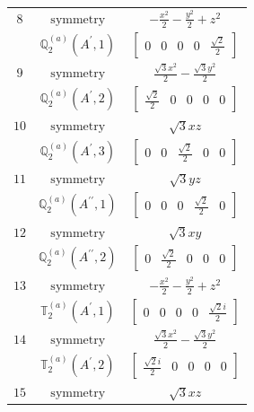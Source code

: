 \documentclass[fleqn,8pt,landscape]{jsarticle}
\begin{document}
\begin{longtable}{ccc}
$ 8 $ & $ \text{symmetry} $ & $ - \frac{x^{2}}{2} - \frac{y^{2}}{2} + z^{2} $ \\
$  $ & $ \mathbb{Q}_{2}^{(a)}(A^{\prime},1) $ & $ \begin{bmatrix} 0 & 0 & 0 & 0 & \frac{\sqrt{2}}{2} \end{bmatrix} $ \\ \hline
$ 9 $ & $ \text{symmetry} $ & $ \frac{\sqrt{3} x^{2}}{2} - \frac{\sqrt{3} y^{2}}{2} $ \\
$  $ & $ \mathbb{Q}_{2}^{(a)}(A^{\prime},2) $ & $ \begin{bmatrix} \frac{\sqrt{2}}{2} & 0 & 0 & 0 & 0 \end{bmatrix} $ \\ \hline
$ 10 $ & $ \text{symmetry} $ & $ \sqrt{3} x z $ \\
$  $ & $ \mathbb{Q}_{2}^{(a)}(A^{\prime},3) $ & $ \begin{bmatrix} 0 & 0 & \frac{\sqrt{2}}{2} & 0 & 0 \end{bmatrix} $ \\ \hline
$ 11 $ & $ \text{symmetry} $ & $ \sqrt{3} y z $ \\
$  $ & $ \mathbb{Q}_{2}^{(a)}(A^{\prime\prime},1) $ & $ \begin{bmatrix} 0 & 0 & 0 & \frac{\sqrt{2}}{2} & 0 \end{bmatrix} $ \\ \hline
$ 12 $ & $ \text{symmetry} $ & $ \sqrt{3} x y $ \\
$  $ & $ \mathbb{Q}_{2}^{(a)}(A^{\prime\prime},2) $ & $ \begin{bmatrix} 0 & \frac{\sqrt{2}}{2} & 0 & 0 & 0 \end{bmatrix} $ \\ \hline
$ 13 $ & $ \text{symmetry} $ & $ - \frac{x^{2}}{2} - \frac{y^{2}}{2} + z^{2} $ \\
$  $ & $ \mathbb{T}_{2}^{(a)}(A^{\prime},1) $ & $ \begin{bmatrix} 0 & 0 & 0 & 0 & \frac{\sqrt{2} i}{2} \end{bmatrix} $ \\ \hline
$ 14 $ & $ \text{symmetry} $ & $ \frac{\sqrt{3} x^{2}}{2} - \frac{\sqrt{3} y^{2}}{2} $ \\
$  $ & $ \mathbb{T}_{2}^{(a)}(A^{\prime},2) $ & $ \begin{bmatrix} \frac{\sqrt{2} i}{2} & 0 & 0 & 0 & 0 \end{bmatrix} $ \\ \hline
$ 15 $ & $ \text{symmetry} $ & $ \sqrt{3} x z $ \\

\end{longtable}
\end{document}
